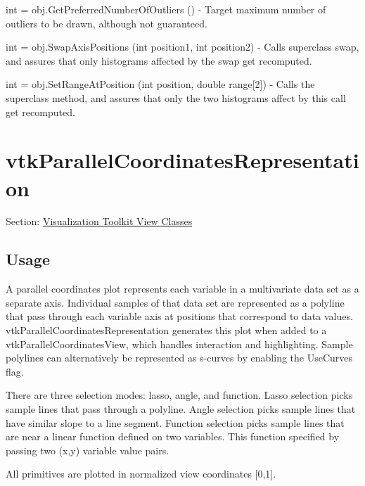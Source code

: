 \begin{DoxyItemize}
\item {\ttfamily int = obj.\-Get\-Preferred\-Number\-Of\-Outliers ()} -\/ Target maximum number of outliers to be drawn, although not guaranteed.  
\item {\ttfamily int = obj.\-Swap\-Axis\-Positions (int position1, int position2)} -\/ Calls superclass swap, and assures that only histograms affected by the swap get recomputed.  
\item {\ttfamily int = obj.\-Set\-Range\-At\-Position (int position, double range\mbox{[}2\mbox{]})} -\/ Calls the superclass method, and assures that only the two histograms affect by this call get recomputed.  
\end{DoxyItemize}\hypertarget{vtkviews_vtkparallelcoordinatesrepresentation}{}\section{vtk\-Parallel\-Coordinates\-Representation}\label{vtkviews_vtkparallelcoordinatesrepresentation}
Section\-: \hyperlink{sec_vtkviews}{Visualization Toolkit View Classes} \hypertarget{vtkwidgets_vtkxyplotwidget_Usage}{}\subsection{Usage}\label{vtkwidgets_vtkxyplotwidget_Usage}
A parallel coordinates plot represents each variable in a multivariate data set as a separate axis. Individual samples of that data set are represented as a polyline that pass through each variable axis at positions that correspond to data values. vtk\-Parallel\-Coordinates\-Representation generates this plot when added to a vtk\-Parallel\-Coordinates\-View, which handles interaction and highlighting. Sample polylines can alternatively be represented as s-\/curves by enabling the Use\-Curves flag.

There are three selection modes\-: lasso, angle, and function. Lasso selection picks sample lines that pass through a polyline. Angle selection picks sample lines that have similar slope to a line segment. Function selection picks sample lines that are near a linear function defined on two variables. This function specified by passing two (x,y) variable value pairs.

All primitives are plotted in normalized view coordinates \mbox{[}0,1\mbox{]}.

